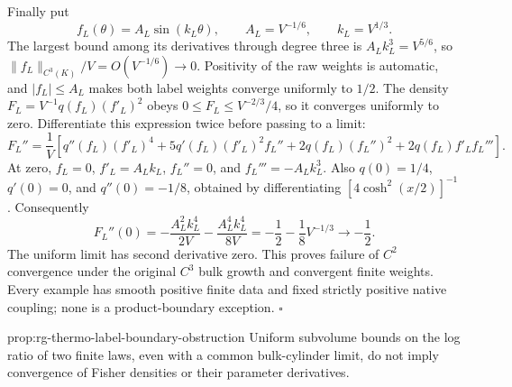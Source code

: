 Finally put
\begin{equation}
 f_L(\theta)=A_L\sin(k_L\theta),\qquad
 A_L=V^{-1/6},\qquad k_L=V^{1/3}.
 \label{eq:rg-thermo-label-oscillatory-data}
\end{equation}
The largest bound among its derivatives through degree three is
$A_Lk_L^3=V^{5/6}$, so
$\|f_L\|_{C^3(K)}/V=O(V^{-1/6})\to0$. Positivity of the raw weights
is automatic, and $|f_L|\leq A_L$ makes both label weights converge
uniformly to $1/2$. The density
$F_L=V^{-1}q(f_L)(f'_L)^2$ obeys
$0\leq F_L\leq V^{-2/3}/4$, so it converges uniformly to zero.
Differentiate this expression twice before passing to a limit:
\begin{equation}
 F_L''=\frac1V\left[q''(f_L)(f'_L)^4
       +5q'(f_L)(f'_L)^2f_L''
       +2q(f_L)(f_L'')^2+2q(f_L)f'_Lf_L'''\right].
 \label{eq:rg-thermo-label-oscillatory-derivative}
\end{equation}
At zero, $f_L=0$, $f'_L=A_Lk_L$, $f_L''=0$, and
$f_L'''=-A_Lk_L^3$. Also $q(0)=1/4$, $q'(0)=0$, and
$q''(0)=-1/8$, obtained by differentiating
$[4\cosh^2(x/2)]^{-1}$. Consequently
\begin{equation}
 F_L''(0)=-\frac{A_L^2k_L^4}{2V}
          -\frac{A_L^4k_L^4}{8V}
          =-\frac12-\frac18V^{-1/3}\longrightarrow-\frac12.
 \label{eq:rg-thermo-label-oscillatory-failure}
\end{equation}
The uniform limit has second derivative zero. This proves failure of
$C^2$ convergence under the original $C^3$ bulk growth and convergent
finite weights. Every example has smooth positive finite data and
fixed strictly positive native coupling; none is a product-boundary
exception. $\square$

{prop:rg-thermo-label-boundary-obstruction}
Uniform subvolume bounds on the log ratio of two finite laws, even
with a common bulk-cylinder limit, do not imply convergence of Fisher
densities or their parameter derivatives.\thermoestablishedstatus


